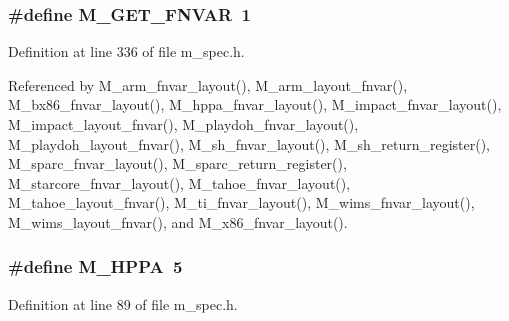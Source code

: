\subsubsection{\setlength{\rightskip}{0pt plus 5cm}\#define M\_\-GET\_\-FNVAR~1}\label{m__spec_8h_ffd3d6ed7f6e3e85c57e73b1231b6b71}




Definition at line 336 of file m\_\-spec.h.

Referenced by M\_\-arm\_\-fnvar\_\-layout(), M\_\-arm\_\-layout\_\-fnvar(), M\_\-bx86\_\-fnvar\_\-layout(), M\_\-hppa\_\-fnvar\_\-layout(), M\_\-impact\_\-fnvar\_\-layout(), M\_\-impact\_\-layout\_\-fnvar(), M\_\-playdoh\_\-fnvar\_\-layout(), M\_\-playdoh\_\-layout\_\-fnvar(), M\_\-sh\_\-fnvar\_\-layout(), M\_\-sh\_\-return\_\-register(), M\_\-sparc\_\-fnvar\_\-layout(), M\_\-sparc\_\-return\_\-register(), M\_\-starcore\_\-fnvar\_\-layout(), M\_\-tahoe\_\-fnvar\_\-layout(), M\_\-tahoe\_\-layout\_\-fnvar(), M\_\-ti\_\-fnvar\_\-layout(), M\_\-wims\_\-fnvar\_\-layout(), M\_\-wims\_\-layout\_\-fnvar(), and M\_\-x86\_\-fnvar\_\-layout().
\subsubsection{\setlength{\rightskip}{0pt plus 5cm}\#define M\_\-HPPA~5}\label{m__spec_8h_c62fdd0edb9a70e0bedab85abc85ffab}




Definition at line 89 of file m\_\-spec.h.

